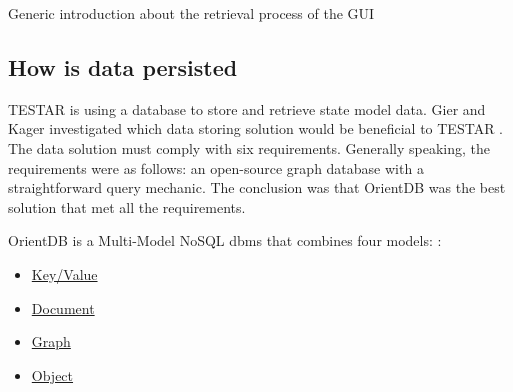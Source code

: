     Generic introduction about the retrieval process of the GUI

    


\subsection{How is data persisted}

    TESTAR is using a database to store and retrieve state model data. Gier and Kager investigated which data storing solution would be beneficial to TESTAR \cite{GierKager}. The data solution must comply with six requirements. Generally speaking, the requirements were as follows: an open-source graph database with a straightforward query mechanic. The conclusion was that OrientDB was the best solution that met all the requirements. 
    
    OrientDB is a Multi-Model NoSQL \acrfull{dbms} that combines four models: \cite{orientDbModeling}:
   \begin{samepage}
        \begin{itemize}
            \item \hyperlink{db:key-value}{Key/Value}
            \item \hyperlink{db:document}{Document}
            \item \hyperlink{db:graph}{Graph}
            \item \hyperlink{db:object}{Object}
        \end{itemize}
    \end{samepage}

